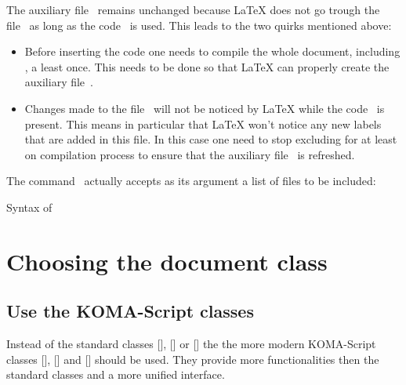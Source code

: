 The auxiliary file~ remains unchanged because {\LaTeX} does not go trough the file~ as long as the code~ is used.
This leads to the two quirks mentioned above:
\begin{itemize}
  \item
    Before inserting the code  one needs to compile the whole document, including , a least once.
    This needs to be done so that {\LaTeX} can properly create the auxiliary file~.
  \item
    Changes made to the file~ will not be noticed by {\LaTeX} while the code~ is present.
    This means in particular that {\LaTeX} won’t notice any new labels that are added in this file.
    In this case one need to stop excluding  for at least on compilation process to ensure that the auxiliary file~ is refreshed.
\end{itemize}

The command~ actually accepts as its argument a list of files to be included:
\begin{showcode}{Syntax of }
  
\end{showcode}





\section{Choosing the document class}



\subsection{Use the KOMA-Script classes}

Instead of the standard classes [\optname], [\optname] or [\optname] the the more modern KOMA-Script classes [\optname], [\optname] and [\optname] should be used.
They provide more functionalities then the standard classes and a more unified interface.


